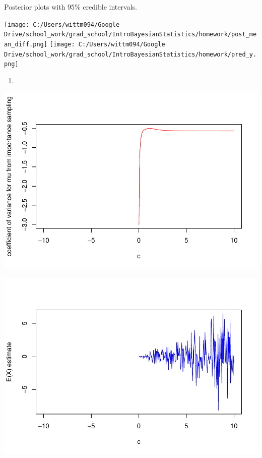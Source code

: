 \documentclass[
]{article}
\begin{document}
Posterior plots with 95\% credible intervals.

\texttt{[image: C:/Users/wittm094/Google Drive/school\_work/grad\_school/IntroBayesianStatistics/homework/post\_mean\_diff.png]}
\texttt{[image: C:/Users/wittm094/Google Drive/school\_work/grad\_school/IntroBayesianStatistics/homework/pred\_y.png]}

\begin{enumerate}
\def\labelenumi{\arabic{enumi})}
\setcounter{enumi}{3}
\item
\end{enumerate}

\begin{center}\includegraphics{hw2_files/figure-latex/unnamed-chunk-7-1} \end{center}

\begin{center}\includegraphics{hw2_files/figure-latex/unnamed-chunk-7-2} \end{center}
\end{document}
